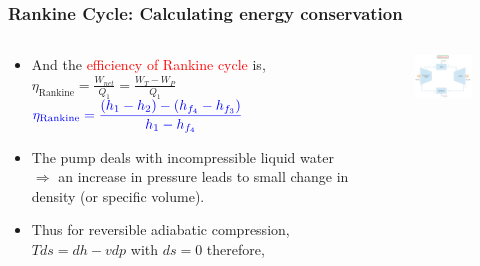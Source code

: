 \documentclass[10pt,compress,handout,ignorenonframetext]{beamer}
\begin{document}
\begin{frame}
 \frametitle{Rankine Cycle: Calculating energy conservation}
  \begin{columns}
   \begin{column}[c]{0.45\linewidth}
    \begin{itemize}
      \item <1-> And the \textcolor{red}{efficiency of Rankine cycle} is,
       $\eta_{\text{Rankine}}=\displaystyle\frac{W_{net}}{Q_{1}}=\displaystyle\frac{W_{T}-W_{P}}{Q_{1}}$ \\
       $\textcolor{blue}{\eta_{\text{Rankine}}=\displaystyle\frac{\left(h_{1}-h_{2}\right)-\left(h_{f_{4}}-h_{f_{3}}\right)}{h_{1}-h_{f_{4}}}}$
      \item <2-> The pump deals with incompressible liquid water $\Rightarrow$ an increase in pressure leads to small change in density (or specific volume). 
      \item <3-> Thus for reversible adiabatic compression, $Tds=dh-vdp$ with $ds=0$ therefore,
     \end{itemize}
    \end{column}
    \begin{column}[c]{0.55\linewidth}
     \begin{figure}%
      \begin{center}
       \includegraphics[width=6.5cm,clip]{./Pics/Simple_Rankine_Cycle}

\end{center}
\end{figure}
\end{column}
\end{columns}
\end{frame}
\end{document}
